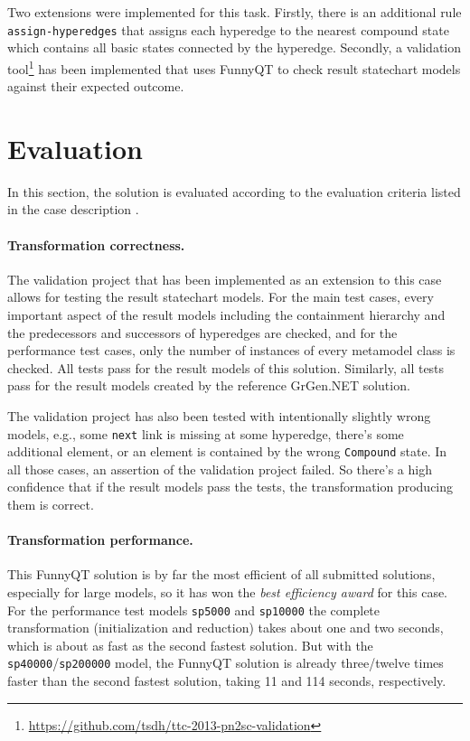 \documentclass[submission]{eptcs}
\begin{document}
\begin{sloppypar}
  Two extensions were implemented for this task.  Firstly, there is an
  additional rule \verb|assign-hyperedges| that assigns each hyperedge to the
  nearest compound state which contains all basic states connected by the
  hyperedge.  Secondly, a validation
  tool\footnote{\url{https://github.com/tsdh/ttc-2013-pn2sc-validation}} has
  been implemented that uses FunnyQT to check result statechart models against
  their expected outcome.
\end{sloppypar}
\section{Evaluation}
\label{sec:evaluation}

In this section, the solution is evaluated according to the evaluation criteria
listed in the case description \cite{pn2sccasedesc}.

\paragraph{Transformation correctness.}

The validation project that has been implemented as an extension to this case
allows for testing the result statechart models.  For the main test cases,
every important aspect of the result models including the containment hierarchy
and the predecessors and successors of hyperedges are checked, and for the
performance test cases, only the number of instances of every metamodel class
is checked.  All tests pass for the result models of this solution.  Similarly,
all tests pass for the result models created by the reference GrGen.NET
solution.

The validation project has also been tested with intentionally slightly wrong
models, e.g., some \verb|next| link is missing at some hyperedge, there's some
additional element, or an element is contained by the wrong \verb|Compound|
state.  In all those cases, an assertion of the validation project failed.  So
there's a high confidence that if the result models pass the tests, the
transformation producing them is correct.

\paragraph{Transformation performance.}

This FunnyQT solution is by far the most efficient of all submitted solutions,
especially for large models, so it has won the \emph{best efficiency award} for
this case.  For the performance test models \verb|sp5000| and \verb|sp10000|
the complete transformation (initialization and reduction) takes about one and
two seconds, which is about as fast as the second fastest solution.  But with
the \verb|sp40000|/\verb|sp200000| model, the FunnyQT solution is already
three/twelve times faster than the second fastest solution, taking 11 and 114
seconds, respectively.
\end{document}

